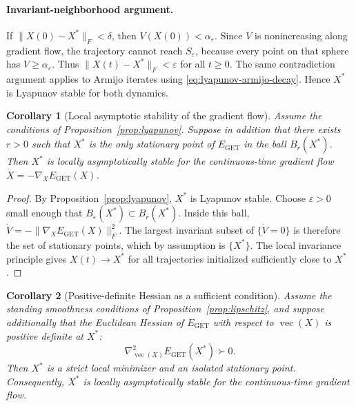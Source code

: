 \documentclass[11pt,a4paper]{article}
\newtheorem{corollary}{Corollary}
\begin{document}
\paragraph{Invariant-neighborhood argument.}
If $\|X(0)-X^*\|_F<\delta$, then $V(X(0))<\alpha_\varepsilon$. Since $V$ is
nonincreasing along gradient flow, the trajectory cannot reach
$S_\varepsilon$, because every point on that sphere has
$V\ge\alpha_\varepsilon$. Thus $\|X(t)-X^*\|_F<\varepsilon$ for all $t\ge0$.
The same contradiction argument applies to Armijo iterates using
\eqref{eq:lyapunov-armijo-decay}. Hence $X^*$ is Lyapunov stable for both
dynamics.

\begin{corollary}[Local asymptotic stability of the gradient flow]
\label{cor:lyapunov-asymptotic}
Assume the conditions of Proposition~\ref{prop:lyapunov}. Suppose in addition
that there exists $r>0$ such that $X^*$ is the only stationary point of
$E_{\mathrm{GET}}$ in the ball $B_r(X^*)$. Then $X^*$ is locally
asymptotically stable for the continuous-time gradient flow
$\dot X = -\nabla_X E_{\mathrm{GET}}(X)$.
\end{corollary}

\begin{proof}
By Proposition~\ref{prop:lyapunov}, $X^*$ is Lyapunov stable. Choose
$\varepsilon>0$ small enough that $B_\varepsilon(X^*)\subset B_r(X^*)$.
Inside this ball, $\dot V=-\|\nabla_X E_{\mathrm{GET}}(X)\|_F^2$. The largest
invariant subset of $\{\dot V=0\}$ is therefore the set of stationary points,
which by assumption is $\{X^*\}$. The local invariance principle gives
$X(t)\to X^*$ for all trajectories initialized sufficiently close to $X^*$.
\end{proof}

\begin{corollary}[Positive-definite Hessian as a sufficient condition]
\label{cor:lyapunov-hessian}
Assume the standing smoothness conditions of Proposition~\ref{prop:lipschitz},
and suppose additionally that the Euclidean Hessian of $E_{\mathrm{GET}}$ with
respect to $\operatorname{vec}(X)$ is positive definite at $X^*$:
\begin{equation}
  \nabla^2_{\operatorname{vec}(X)} E_{\mathrm{GET}}(X^*) \succ 0.
\end{equation}
Then $X^*$ is a strict local minimizer and an isolated stationary point.
Consequently, $X^*$ is locally asymptotically stable for the continuous-time
gradient flow.
\end{corollary}
\end{document}
